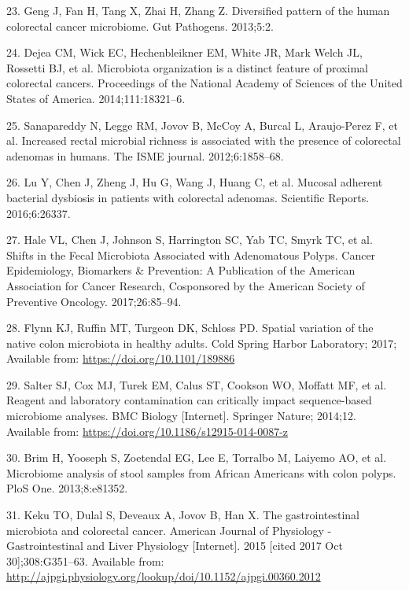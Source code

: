 \documentclass[12pt,]{article}
\begin{document}
\hypertarget{ref-geng_diversified_2013}{}
23. Geng J, Fan H, Tang X, Zhai H, Zhang Z. Diversified pattern of the
human colorectal cancer microbiome. Gut Pathogens. 2013;5:2.

\hypertarget{ref-dejea_microbiota_2014}{}
24. Dejea CM, Wick EC, Hechenbleikner EM, White JR, Mark Welch JL,
Rossetti BJ, et al. Microbiota organization is a distinct feature of
proximal colorectal cancers. Proceedings of the National Academy of
Sciences of the United States of America. 2014;111:18321--6.

\hypertarget{ref-sanapareddy_increased_2012}{}
25. Sanapareddy N, Legge RM, Jovov B, McCoy A, Burcal L, Araujo-Perez F,
et al. Increased rectal microbial richness is associated with the
presence of colorectal adenomas in humans. The ISME journal.
2012;6:1858--68.

\hypertarget{ref-lu_mucosal_2016}{}
26. Lu Y, Chen J, Zheng J, Hu G, Wang J, Huang C, et al. Mucosal
adherent bacterial dysbiosis in patients with colorectal adenomas.
Scientific Reports. 2016;6:26337.

\hypertarget{ref-hale_shifts_2017}{}
27. Hale VL, Chen J, Johnson S, Harrington SC, Yab TC, Smyrk TC, et al.
Shifts in the Fecal Microbiota Associated with Adenomatous Polyps.
Cancer Epidemiology, Biomarkers \& Prevention: A Publication of the
American Association for Cancer Research, Cosponsored by the American
Society of Preventive Oncology. 2017;26:85--94.

\hypertarget{ref-Flynn_preprint_2017}{}
28. Flynn KJ, Ruffin MT, Turgeon DK, Schloss PD. Spatial variation of
the native colon microbiota in healthy adults. Cold Spring Harbor
Laboratory; 2017; Available from: \url{https://doi.org/10.1101/189886}

\hypertarget{ref-Salter_contamination_2014}{}
29. Salter SJ, Cox MJ, Turek EM, Calus ST, Cookson WO, Moffatt MF, et
al. Reagent and laboratory contamination can critically impact
sequence-based microbiome analyses. BMC Biology {[}Internet{]}. Springer
Nature; 2014;12. Available from:
\url{https://doi.org/10.1186/s12915-014-0087-z}

\hypertarget{ref-brim_microbiome_2013}{}
30. Brim H, Yooseph S, Zoetendal EG, Lee E, Torralbo M, Laiyemo AO, et
al. Microbiome analysis of stool samples from African Americans with
colon polyps. PloS One. 2013;8:e81352.

\hypertarget{ref-keku_gastrointestinal_2015}{}
31. Keku TO, Dulal S, Deveaux A, Jovov B, Han X. The gastrointestinal
microbiota and colorectal cancer. American Journal of Physiology -
Gastrointestinal and Liver Physiology {[}Internet{]}. 2015 {[}cited 2017
Oct 30{]};308:G351--63. Available from:
\url{http://ajpgi.physiology.org/lookup/doi/10.1152/ajpgi.00360.2012}
\end{document}
